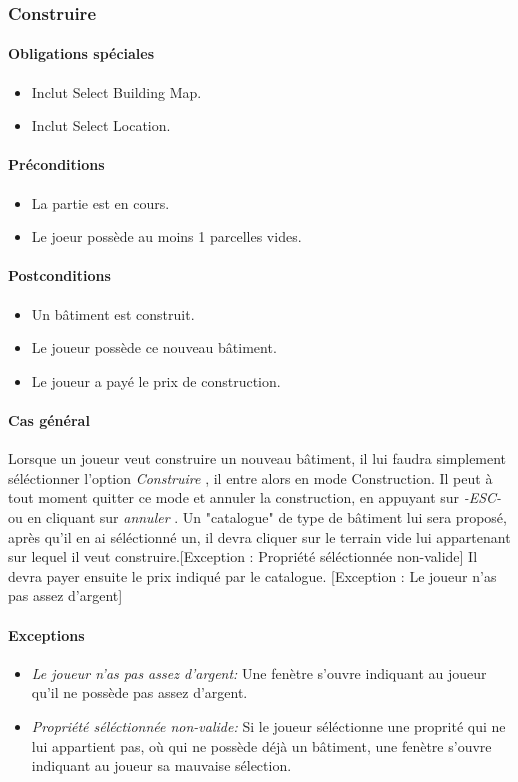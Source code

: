 \documentclass[a4paper,11pt]{report}
\begin{document}
\subsubsection{Construire}
\paragraph{Obligations spéciales}
\begin{itemize}
 \item Inclut Select Building Map.
 \item Inclut Select Location.
\end{itemize}
\paragraph{Préconditions}
\begin{itemize}
 \item La partie est en cours.
 \item Le joeur possède au moins 1 parcelles vides.
\end{itemize}
\newpage
\paragraph{Postconditions}
\begin{itemize}
 \item Un bâtiment est construit.
 \item Le joueur possède ce nouveau bâtiment.
 \item Le joueur a payé le prix de construction.
\end{itemize}
\paragraph{Cas général}
Lorsque un joueur veut construire un nouveau bâtiment, il lui faudra simplement séléctionner l'option \og \textit{Construire} \fg, il entre alors en mode Construction. Il peut à tout moment quitter ce mode et annuler la construction, en appuyant sur \og \textit{-ESC-} \fg ou en cliquant sur \og \textit{annuler} \fg. Un "catalogue" de type de bâtiment lui sera proposé, après qu'il en ai séléctionné un, il devra cliquer sur le terrain vide lui appartenant sur lequel il veut construire.[Exception : Propriété séléctionnée non-valide] Il devra payer ensuite le prix indiqué par le catalogue. [Exception : Le joueur n'as pas assez d'argent]
\paragraph{Exceptions}
\begin{itemize}
 \item \textit{Le joueur n'as pas assez d'argent:}  Une fenètre s'ouvre indiquant au joueur qu'il ne possède pas assez d'argent.
 \item \textit{Propriété séléctionnée non-valide:}  Si le joueur séléctionne une proprité qui ne lui appartient pas, où qui ne possède déjà un bâtiment, une fenètre s'ouvre indiquant au joueur sa mauvaise sélection.
\end{itemize}
\end{document}

